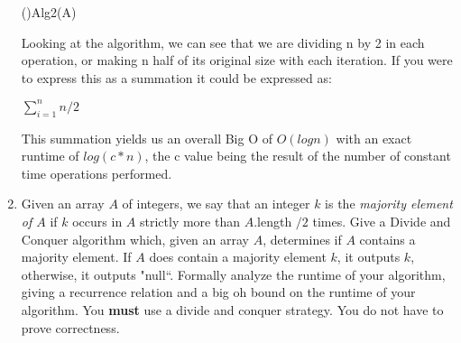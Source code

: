 \documentclass[11pt]{amsart}
\begin{document}
\begin{enumerate}
\begin{algorithm}[H]
\Fn(){Alg2(A)}{
\SetAlgoLined
\SetNoFillComment
\DontPrintSemicolon
}
\end{algorithm}
\bigskip
Looking at the algorithm, we can see that we are dividing n by 2 in each operation, or making n half of its original size with each iteration. If you were to express this as a summation it could be expressed as:
\begin{center}
	$\sum_{i=1}^{n} n / 2$
\end{center}	
This summation yields us an overall Big O of $O(log n)$ with an exact runtime of $log(c * n)$, the c value being the result of the number of constant time operations performed.
\bigskip
\newpage
\item Given an array $A$ of integers, we say that an integer $k$ is the \textit{majority element of $A$} if $k$ occurs in $A$ strictly more than $A$.length $/2$ times. Give a Divide and Conquer algorithm which, given an array $A$, determines if $A$ contains a majority element. If $A$ does contain a majority element $k$, it outputs $k$, otherwise, it outputs "null``. Formally analyze the runtime of your algorithm, giving a recurrence relation and a big oh bound on the runtime of your algorithm. You \textbf{must} use a divide and conquer strategy. You do not have to prove correctness.


\end{enumerate}
\end{document}
